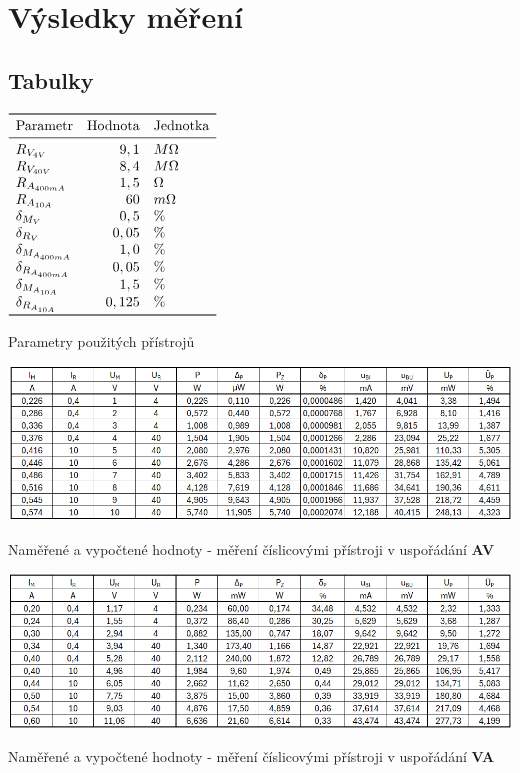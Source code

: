 \documentclass[a4paper, czech]{article}
\begin{document}
\section{Výsledky měření}

\subsection{Tabulky}

\begin{table}[H]
    \centering
    $\begin{array}{lrl}
        \toprule
        \text{Parametr} & \text{Hodnota} & \text{Jednotka} \\
        \midrule
        R_{V_{4V}} & 9,1 & M \Omega \\
        R_{V_{40V}} & 8,4 & M \Omega \\
        R_{A_{400mA}} & 1,5 & \Omega \\
        R_{A_{10A}} & 60 & m \Omega \\
        \delta_{M_{V}} & 0,5 & \% \\
        \delta_{R_{V}} & 0,05 & \% \\
        \delta_{M_{A_{400mA}}} & 1,0 & \% \\
        \delta_{R_{A_{400mA}}} & 0,05 & \% \\
        \delta_{M_{A_{10A}}} & 1,5 & \% \\
        \delta_{R_{A_{10A}}} & 0,125 & \% \\
        \bottomrule
    \end{array}$
    \caption{Parametry použitých přístrojů}
\end{table}

\begin{table}[H]
    \includegraphics[width = \textwidth]{tabulka_av.png}
    \caption{Naměřené a vypočtené hodnoty - měření číslicovými přístroji v uspořádání \textbf{AV}}
\end{table}

\begin{table}[H]
    \includegraphics[width = \textwidth]{tabulka_va.png}
    \caption{Naměřené a vypočtené hodnoty - měření číslicovými přístroji v uspořádání \textbf{VA}}
\end{table}
\end{document}
